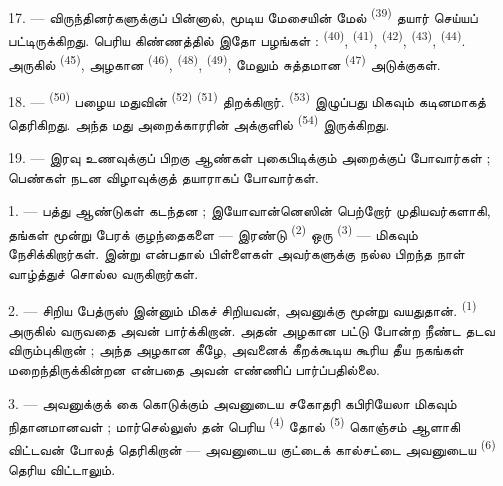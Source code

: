 \VUsaut{2.4mm}
\VUsaut{3.0mm}

17. --- விருந்தினர்களுக்குப் பின்னால்,  மூடிய
மேசையின் மேல்  \textsuperscript{(39)} தயார் செய்யப்
பட்டிருக்கிறது. பெரிய கிண்ணத்தில் இதோ பழங்கள் : 
\textsuperscript{(40)},  \textsuperscript{(41)},
 \textsuperscript{(42)}, 
\textsuperscript{(43)},  \textsuperscript{(44)}. அருகில்
 \textsuperscript{(45)}, அழகான 
\textsuperscript{(46)},  \textsuperscript{(48)},
 \textsuperscript{(49)}, மேலும் சுத்தமான 
\textsuperscript{(47)} அடுக்குகள்.

18. ---  \textsuperscript{(50)} பழைய மதுவின்
 \textsuperscript{(52)} 
\textsuperscript{(51)} திறக்கிறார். 
\textsuperscript{(53)} இழுப்பது மிகவும் கடினமாகத் தெரிகிறது. அந்த மது
அறைக்காரரின் அக்குளில்  \textsuperscript{(54)} இருக்கிறது.

19. --- இரவு உணவுக்குப் பிறகு ஆண்கள் புகைபிடிக்கும் அறைக்குப் போவார்கள் ;
பெண்கள் நடன விழாவுக்குத் தயாராகப் போவார்கள்.

\VUsaut{5.0mm}
\VUsaut{1.6mm}
\VUsaut{2.6mm}

\VUsaut{3.0mm}

1. --- பத்து ஆண்டுகள் கடந்தன ; இயோவான்னெஸின் பெற்றோர் முதியவர்களாகி,
தங்கள் மூன்று பேரக் குழந்தைகளை — இரண்டு 
\textsuperscript{(2)} ஒரு  \textsuperscript{(3)} —
மிகவும் நேசிக்கிறார்கள். இன்று  என்பதால்
பிள்ளைகள் அவர்களுக்கு நல்ல பிறந்த நாள் வாழ்த்துச் சொல்ல வருகிறார்கள்.

2. --- சிறிய பேத்ருஸ் இன்னும் மிகச் சிறியவன், அவனுக்கு மூன்று வயதுதான்.
 \textsuperscript{(1)} அருகில் வருவதை அவன் பார்க்கிறான். அதன்
அழகான பட்டு போன்ற  நீண்ட  தடவ
விரும்புகிறான் ; அந்த அழகான  கீழே, அவனைக் கீறக்கூடிய
கூரிய தீய நகங்கள் மறைந்திருக்கின்றன என்பதை அவன் எண்ணிப் பார்ப்பதில்லை.

3. --- அவனுக்குக் கை கொடுக்கும் அவனுடைய சகோதரி கபிரியேலா மிகவும்
நிதானமானவள் ; மார்செல்லுஸ் தன் பெரிய 
\textsuperscript{(4)} தோல்  \textsuperscript{(5)}
கொஞ்சம் ஆளாகி விட்டவன் போலத் தெரிகிறான் — அவனுடைய குட்டைக் கால்சட்டை
அவனுடைய  \textsuperscript{(6)} தெரிய விட்டாலும்.

